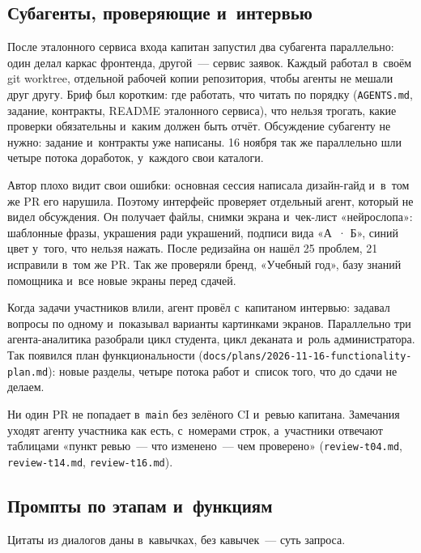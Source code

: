 \documentclass[a4paper,10pt]{article}
\let\oldsubsection\subsection
\renewcommand{\subsection}{\Needspace{10\baselineskip}\oldsubsection}
\newcommand{\code}[1]{\texttt{#1}}
\begin{document}
\subsection{Субагенты, проверяющие и~интервью}\label{s3-agents}

После эталонного сервиса входа капитан запустил два субагента параллельно: один делал каркас фронтенда, другой~— сервис заявок. Каждый работал в~своём git worktree, отдельной рабочей копии репозитория, чтобы агенты не мешали друг другу. Бриф был коротким: где работать, что читать по порядку (\code{AGENTS.md}, задание, контракты, README эталонного сервиса), что нельзя трогать, какие проверки обязательны и~каким должен быть отчёт. Обсуждение субагенту не нужно: задание и~контракты уже написаны. 16 ноября так же параллельно шли четыре потока доработок, у~каждого свои каталоги.

Автор плохо видит свои ошибки: основная сессия написала дизайн-гайд и~в~том же PR его нарушила. Поэтому интерфейс проверяет отдельный агент, который не видел обсуждения. Он получает файлы, снимки экрана и~чек-лист «нейрослопа»: шаблонные фразы, украшения ради украшений, подписи вида «А~· Б», синий цвет у~того, что нельзя нажать. После редизайна он нашёл 25 проблем, 21 исправили в~том же PR. Так же проверяли бренд, «Учебный год», базу знаний помощника и~все новые экраны перед сдачей.

Когда задачи участников влили, агент провёл с~капитаном интервью: задавал вопросы по одному и~показывал варианты картинками экранов. Параллельно три агента-аналитика разобрали цикл студента, цикл деканата и~роль администратора. Так появился план функциональности (\code{docs/\allowbreak{}plans/\allowbreak{}2026-11-16-functionality-plan.md}): новые разделы, четыре потока работ и~список того, что до сдачи не делаем.

Ни один PR не попадает в~\code{main} без зелёного CI и~ревью капитана. Замечания уходят агенту участника как есть, с~номерами строк, а~участники отвечают таблицами «пункт ревью~— что изменено~— чем проверено» (\code{review-t04.md}, \code{review-t14.md}, \code{review-t16.md}).

\subsection{Промпты по этапам и~функциям}\label{s3-prompts}

Цитаты из диалогов даны в~кавычках, без кавычек~— суть запроса.
\end{document}
